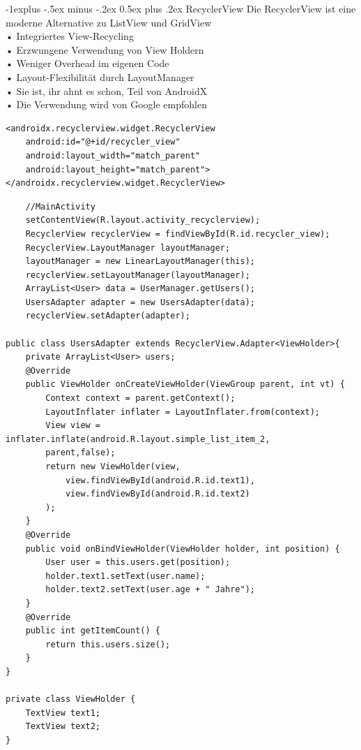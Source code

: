 \documentclass[10pt,landscape,a4paper]{article}
\makeatletter
\renewcommand{\subsection}{\@startsection{subsection}{2}{0mm}%
                                {-1explus -.5ex minus -.2ex}%
                                {0.5ex plus .2ex}%
                                {\normalfont\small\bfseries}}
\makeatother
\begin{document}
\begin{multicols*}{3}
\subsection{RecyclerView}
Die RecyclerView ist eine moderne Alternative zu ListView und GridView\\
• Integriertes View-Recycling\\
• Erzwungene Verwendung von View Holdern\\
• Weniger Overhead im eigenen Code\\
• Layout-Flexibilität durch LayoutManager\\
• Sie ist, ihr ahnt es schon, Teil von AndroidX\\
• Die Verwendung wird von Google empfohlen
\begin{verbatim}
<androidx.recyclerview.widget.RecyclerView
    android:id="@+id/recycler_view"
    android:layout_width="match_parent"
    android:layout_height="match_parent">
</androidx.recyclerview.widget.RecyclerView>
\end{verbatim}
\begin{verbatim}
    //MainActivity
    setContentView(R.layout.activity_recyclerview);
    RecyclerView recyclerView = findViewById(R.id.recycler_view);
    RecyclerView.LayoutManager layoutManager;
    layoutManager = new LinearLayoutManager(this);
    recyclerView.setLayoutManager(layoutManager);
    ArrayList<User> data = UserManager.getUsers();
    UsersAdapter adapter = new UsersAdapter(data);
    recyclerView.setAdapter(adapter);

public class UsersAdapter extends RecyclerView.Adapter<ViewHolder>{
    private ArrayList<User> users;
    @Override
    public ViewHolder onCreateViewHolder(ViewGroup parent, int vt) {
        Context context = parent.getContext();
        LayoutInflater inflater = LayoutInflater.from(context);
        View view = inflater.inflate(android.R.layout.simple_list_item_2,
        parent,false);
        return new ViewHolder(view,
            view.findViewById(android.R.id.text1),
            view.findViewById(android.R.id.text2)
        );
    }
    @Override
    public void onBindViewHolder(ViewHolder holder, int position) {
        User user = this.users.get(position);
        holder.text1.setText(user.name);
        holder.text2.setText(user.age + " Jahre");
    }
    @Override
    public int getItemCount() {
        return this.users.size();
    }
}

private class ViewHolder {
    TextView text1;
    TextView text2;
}
\end{verbatim}

\end{multicols*}
\end{document}
